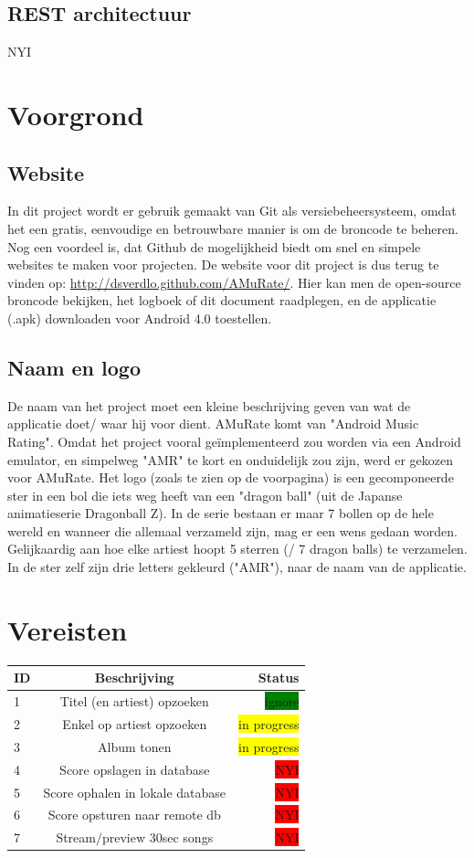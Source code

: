 \documentclass[11pt,a4paper]{article}
\newcommand{\boxyellow}{\colorbox{yellow}{\color{black}in progress}}
\newcommand{\boxred}{\colorbox{red}{\color{black}NYI}}
\begin{document}
	\subsection{REST architectuur}
	NYI
\section{Voorgrond}
	\subsection{Website}
		In dit project wordt er gebruik gemaakt van Git als versiebeheersysteem, omdat het een gratis, eenvoudige en betrouwbare manier is om de broncode te beheren. Nog een voordeel is, dat Github de mogelijkheid biedt om snel en simpele websites te maken voor projecten. De website voor dit project is dus terug te vinden op: \url{http://dsverdlo.github.com/AMuRate/}. Hier kan men de open-source broncode bekijken, het logboek of dit document raadplegen, en de applicatie (.apk) downloaden voor Android 4.0 toestellen.
	\subsection{Naam en logo}
		De naam van het project moet een kleine beschrijving geven van wat de applicatie doet/ waar hij voor dient. AMuRate komt van "Android Music Rating". Omdat het project vooral geïmplementeerd zou worden via een Android emulator, en simpelweg "AMR" te kort en onduidelijk zou zijn, werd er gekozen voor AMuRate. Het logo (zoals te zien op de voorpagina) is een gecomponeerde ster in een bol die iets weg heeft van een "dragon ball" (uit de Japanse animatieserie Dragonball Z). In de serie bestaan er maar 7 bollen op de hele wereld en wanneer die allemaal verzameld zijn, mag er een wens gedaan worden. Gelijkaardig aan hoe elke artiest hoopt 5 sterren (/ 7 dragon balls) te verzamelen. 
	In de ster zelf zijn drie letters gekleurd ("AMR"), naar de naam van de applicatie.
\section{Vereisten}
	\begin{tabular}{| l | c | r |}
	\hline
	ID 	& 	Beschrijving						& Status \\ \hline \hline
	1	&	Titel (en artiest) opzoeken			& \colorbox{green}{\color{green}ignore} \\ \hline
	2	& 	Enkel op artiest opzoeken 			& \boxyellow \\ \hline
	3 	& 	Album tonen 						& \boxyellow \\ \hline
	4	& 	Score opslagen in database 			& \boxred  \\ \hline
	5 	& 	Score ophalen in lokale database 	& \boxred \\ \hline
	6	& 	Score opsturen naar remote db		& \boxred \\ \hline
	7	&	Stream$/$preview 30sec songs		& \boxred \\ \hline
	
	\hline	
	\end{tabular}
\end{document}
